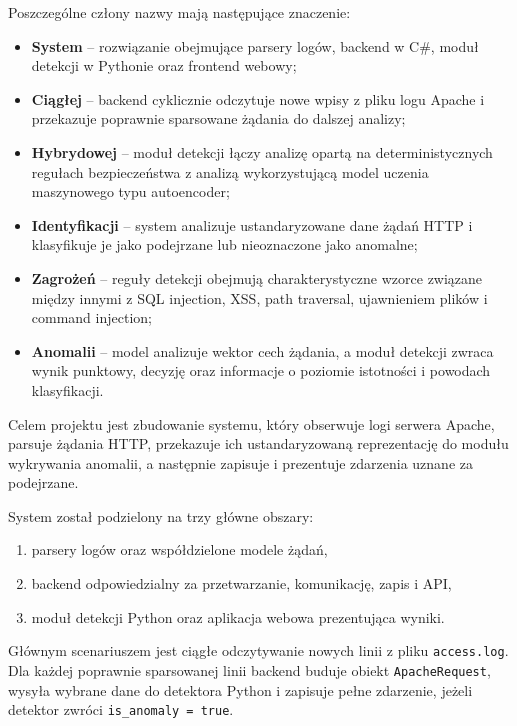 \documentclass[12pt,a4paper]{article}
\newcommand{\code}[1]{\texttt{#1}}
\begin{document}
Poszczególne człony nazwy mają następujące znaczenie:
\begin{itemize}
    \item \textbf{System} -- rozwiązanie obejmujące parsery logów, backend
    w C\#, moduł detekcji w Pythonie oraz frontend webowy;
    \item \textbf{Ciągłej} -- backend cyklicznie odczytuje nowe wpisy z pliku
    logu Apache i przekazuje poprawnie sparsowane żądania do dalszej analizy;
    \item \textbf{Hybrydowej} -- moduł detekcji łączy analizę opartą na
    deterministycznych regułach bezpieczeństwa z analizą wykorzystującą model
    uczenia maszynowego typu autoencoder;
    \item \textbf{Identyfikacji} -- system analizuje ustandaryzowane dane
    żądań HTTP i klasyfikuje je jako podejrzane lub nieoznaczone jako anomalne;
    \item \textbf{Zagrożeń} -- reguły detekcji obejmują charakterystyczne
    wzorce związane między innymi z SQL injection, XSS, path traversal,
    ujawnieniem plików i command injection;
    \item \textbf{Anomalii} -- model analizuje wektor cech żądania, a moduł
    detekcji zwraca wynik punktowy, decyzję oraz informacje o poziomie
    istotności i powodach klasyfikacji.
\end{itemize}

Celem projektu jest zbudowanie systemu, który obserwuje logi serwera Apache,
parsuje żądania HTTP, przekazuje ich ustandaryzowaną reprezentację do modułu
wykrywania anomalii, a następnie zapisuje i prezentuje zdarzenia uznane za
podejrzane.

System został podzielony na trzy główne obszary:
\begin{enumerate}
    \item parsery logów oraz współdzielone modele żądań,
    \item backend odpowiedzialny za przetwarzanie, komunikację, zapis i API,
    \item moduł detekcji Python oraz aplikacja webowa prezentująca wyniki.
\end{enumerate}

Głównym scenariuszem jest ciągłe odczytywanie nowych linii z pliku
\code{access.log}. Dla każdej poprawnie sparsowanej linii backend buduje obiekt
\code{ApacheRequest}, wysyła wybrane dane do detektora Python i zapisuje pełne
zdarzenie, jeżeli detektor zwróci \code{is\_anomaly = true}.
\end{document}
